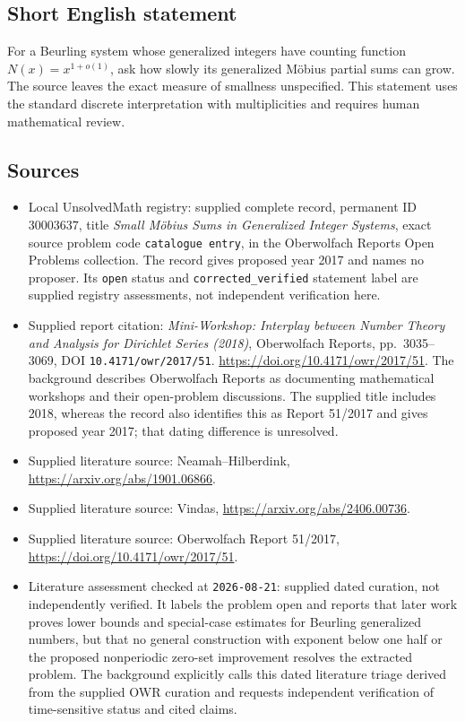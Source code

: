 \documentclass[11pt]{article}
\begin{document}
\subsection{Short English statement}
For a Beurling system whose generalized integers have counting function \(N(x)=x^{1+o(1)}\), ask how slowly its generalized Möbius partial sums can grow. The source leaves the exact measure of smallness unspecified. This statement uses the standard discrete interpretation with multiplicities and requires human mathematical review.
\subsection{Sources}
\begin{itemize}
\item Local UnsolvedMath registry: supplied complete record, permanent ID \(30003637\), title \emph{Small Möbius Sums in Generalized Integer Systems}, exact source problem code \texttt{catalogue entry}, in the Oberwolfach Reports Open Problems collection. The record gives proposed year 2017 and names no proposer. Its \texttt{open} status and \texttt{corrected\_verified} statement label are supplied registry assessments, not independent verification here.
\item Supplied report citation: \emph{Mini-Workshop: Interplay between Number Theory and Analysis for Dirichlet Series (2018)}, Oberwolfach Reports, pp.\ 3035--3069, DOI \texttt{10.4171/owr/2017/51}. \url{https://doi.org/10.4171/owr/2017/51}. The background describes Oberwolfach Reports as documenting mathematical workshops and their open-problem discussions. The supplied title includes 2018, whereas the record also identifies this as Report 51/2017 and gives proposed year 2017; that dating difference is unresolved.
\item Supplied literature source: Neamah--Hilberdink, \url{https://arxiv.org/abs/1901.06866}.
\item Supplied literature source: Vindas, \url{https://arxiv.org/abs/2406.00736}.
\item Supplied literature source: Oberwolfach Report 51/2017, \url{https://doi.org/10.4171/owr/2017/51}.
\item Literature assessment checked at \texttt{2026-08-21}: supplied dated curation, not independently verified. It labels the problem open and reports that later work proves lower bounds and special-case estimates for Beurling generalized numbers, but that no general construction with exponent below one half or the proposed nonperiodic zero-set improvement resolves the extracted problem. The background explicitly calls this dated literature triage derived from the supplied OWR curation and requests independent verification of time-sensitive status and cited claims.
\end{itemize}
\end{document}

